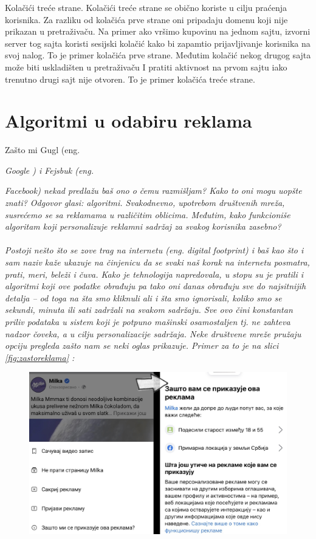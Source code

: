 \documentclass[a4paper]{article}
\begin{document}
	 Kolačići treće strane. Kolačići treće strane se obično koriste u cilju praćenja korisnika. Za razliku od kolačića prve strane oni pripadaju domenu koji nije prikazan u pretraživaču. Na primer ako vršimo kupovinu na jednom sajtu, izvorni server tog sajta koristi sesijski kolačić kako bi zapamtio prijavljivanje korisnika na svoj nalog. To je primer kolačića prve strane. Međutim kolačić nekog drugog sajta može biti uskladišten u pretraživaču I pratiti aktivnost na prvom sajtu iako trenutno drugi sajt nije otvoren. To je primer kolačića treće strane. 
	
	\section{Algoritmi u odabiru reklama}
	\label{sec:algoritmi}
	Zašto mi Gugl (eng.~{\em Google ) i Fejsbuk (eng.~{\em Facebook) nekad predlažu baš ono o čemu razmišljam? Kako to oni mogu uopšte znati? Odgovor glasi: algoritmi. Svakodnevno, upotrebom društvenih mreža, susrećemo se sa reklamama u različitim oblicima. Međutim, 		kako funkcioniše algoritam koji personalizuje reklamni sadržaj za svakog korisnika zasebno?\\ \\
			Postoji nešto što se zove trag na internetu (eng. digital footprint) i baš kao što i sam naziv kaže ukazuje na činjenicu da se svaki naš korak na internetu posmatra, prati, meri, beleži i čuva. Kako je tehnologija napredovala, u stopu su je pratili i algoritmi koji ove podatke 		obrađuju pa tako oni danas obrađuju sve do najsitnijih detalja – od toga na šta smo kliknuli ali i šta smo ignorisali, koliko smo se sekundi, minuta ili sati zadržali na svakom sadržaju. Sve ovo čini konstantan priliv podataka u sistem koji je potpuno mašinski osamostaljen tj. ne 		zahteva nadzor čoveka, a u cilju personalizacije sadržaja. Neke društvene mreže pružaju opciju pregleda zašto nam se neki oglas prikazuje. Primer za to je na slici \ref{fig:zastoreklama} : 
			\begin{figure}[h!]
				\begin{center}
					\includegraphics[scale=0.1]{zastoreklama.jpg}

\end{center}
\end{figure}}}
\end{document}

